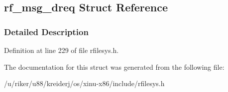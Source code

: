 \hypertarget{structrf__msg__dreq}{}\subsection{rf\+\_\+msg\+\_\+dreq Struct Reference}
\label{structrf__msg__dreq}


\subsubsection{Detailed Description}


Definition at line 229 of file rfilesys.\+h.



The documentation for this struct was generated from the following file\+:\begin{DoxyCompactItemize}
\item 
/u/riker/u88/kreiderj/os/xinu-\/x86/include/rfilesys.\+h\end{DoxyCompactItemize}
